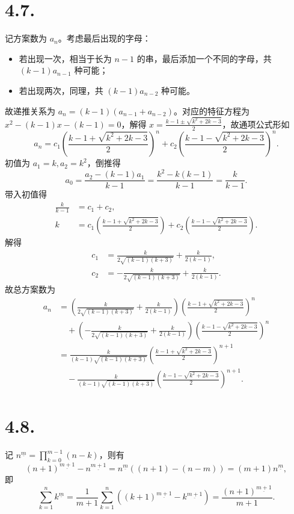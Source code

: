 \documentclass{article}
\begin{document}
\section*{4.7.}
记方案数为 $a_n$。考虑最后出现的字母：
\begin{itemize}
    \item 若出现一次，相当于长为 $n-1$ 的串，最后添加一个不同的字母，共 $(k-1)a_{n-1}$ 种可能；
    \item 若出现两次，同理，共 $(k-1)a_{n-2}$ 种可能。
\end{itemize}
故递推关系为 $a_n=(k-1)(a_{n-1}+a_{n-2})$。对应的特征方程为 $x^2-(k-1)x-(k-1)=0$，解得 $x=\frac{k-1\pm\sqrt{k^2+2k-3}}{2}$，故通项公式形如
\begin{equation}
    a_n=c_1\left(\frac{k-1+\sqrt{k^2+2k-3}}{2}\right)^n+c_2\left(\frac{k-1-\sqrt{k^2+2k-3}}{2}\right)^n.
\end{equation}
初值为 $a_1=k,a_2=k^2$，倒推得
\begin{equation}
    a_0=\frac{a_2-(k-1)a_1}{k-1}=\frac{k^2-k(k-1)}{k-1}=\frac{k}{k-1}.
\end{equation}
带入初值得
\begin{align}
    \frac k{k-1}&=c_1+c_2, \\
    k&=c_1\left(\frac{k-1+\sqrt{k^2+2k-3}}{2}\right)+c_2\left(\frac{k-1-\sqrt{k^2+2k-3}}{2}\right).
\end{align}
解得
\begin{align}
    c_1&=\frac{k}{2\sqrt{(k-1)(k+3)}}+\frac{k}{2(k-1)}, \\
    c_2&=-\frac{k}{2\sqrt{(k-1)(k+3)}}+\frac{k}{2(k-1)}.
\end{align}
故总方案数为
\begin{align}
    a_n&=\left(\frac{k}{2\sqrt{(k-1)(k+3)}}+\frac{k}{2(k-1)}\right)\left(\frac{k-1+\sqrt{k^2+2k-3}}{2}\right)^n \\
    &\quad +\left(-\frac{k}{2\sqrt{(k-1)(k+3)}}+\frac{k}{2(k-1)}\right)\left(\frac{k-1-\sqrt{k^2+2k-3}}{2}\right)^n \\
    &=\frac{k}{(k-1)\sqrt{(k-1)(k+3)}}\left(\frac{k-1+\sqrt{k^2+2k-3}}{2}\right)^{n+1} \\
    &\quad-\frac{k}{(k-1)\sqrt{(k-1)(k+3)}}\left(\frac{k-1-\sqrt{k^2+2k-3}}{2}\right)^{n+1}.
\end{align}

\section*{4.8.}
记 $n^{\underline{m}}=\prod_{k=0}^{m-1}(n-k)$，则有
\begin{equation}
    (n+1)^{\underline{m+1}}-n^{\underline{m+1}}=n^{\underline{m}}((n+1)-(n-m))=(m+1)n^{\underline{m}},
\end{equation}
即
\begin{equation}
    \sum_{k=1}^nk^{\underline{m}}=\frac 1{m+1}\sum_{k=1}^n\left((k+1)^{\underline{m+1}}-k^{\underline{m+1}}\right)=\frac{(n+1)^{\underline{{m+1}}}}{m+1}.
\end{equation}
\end{document}
